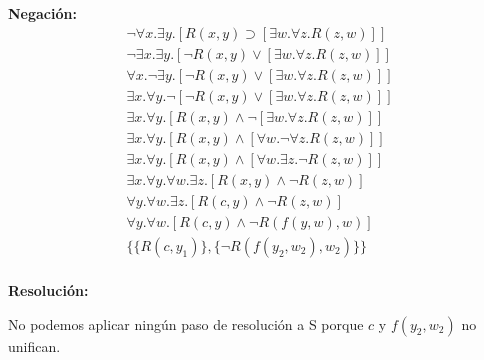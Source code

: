 \documentclass[10pt,a4paper]{article}
\begin{document}
\begin{multicols}{2}
\textbf{Negación:}
\begin{align*}
\lnot\forall x. \exists y. [ R(x,y) \supset [\exists w. \forall z. R(z,w) ]]  \\[1pt]
\lnot\exists x. \exists y. [ \lnot R(x,y) \lor [\exists w. \forall z. R(z,w) ]] \\[1pt]
\forall x.\lnot \exists y. [ \lnot R(x,y) \lor [\exists w. \forall z. R(z,w) ]]  \\[1pt]
\exists x.\forall y. \lnot [ \lnot R(x,y) \lor [\exists w. \forall z. R(z,w) ]]  \\[1pt]
\exists x.\forall y. [ R(x,y) \land \lnot[\exists w. \forall z. R(z,w) ]]  \\[1pt]
\exists x.\forall y. [ R(x,y) \land [\forall w. \lnot\forall z. R(z,w) ]]  \\[1pt]
\exists x.\forall y. [ R(x,y) \land [\forall w. \exists z. \lnot R(z,w) ]] \\[1pt]
\exists x.\forall y. \forall w. \exists z. [ R(x,y) \land \lnot R(z,w) ] \\[1pt]
\forall y. \forall w. \exists z. [ R(c,y) \land \lnot R(z,w) ] \\[1pt]
\forall y. \forall w.[ R(c,y) \land \lnot R(f(y,w),w) ] \\[1pt]
\{ \{R(c,y_1)\},\{\lnot R(f(y_2,w_2),w_2)\}\} \\[1pt]
\end{align*}

\noindent\textbf{Resolución:} 

No podemos aplicar ningún paso de resolución a S  porque $c$ y $f(y_2,w_2)$ no unifican.

\end{multicols}

\newpage
\end{document}
